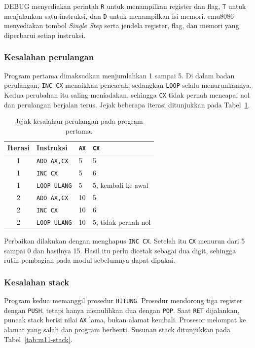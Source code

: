 DEBUG menyediakan perintah \texttt{R} untuk menampilkan register dan
flag, \texttt{T} untuk menjalankan satu instruksi, dan \texttt{D}
untuk menampilkan isi memori. emu8086 menyediakan tombol
\emph{Single Step} serta jendela register, flag, dan memori yang
diperbarui setiap instruksi.

\subsubsection*{Kesalahan perulangan}

Program pertama dimaksudkan menjumlahkan 1 sampai 5. Di dalam badan
perulangan, \texttt{INC CX} menaikkan pencacah, sedangkan
\texttt{LOOP} selalu menurunkannya. Kedua perubahan itu saling
meniadakan, sehingga \texttt{CX} tidak pernah mencapai nol dan
perulangan berjalan terus. Jejak beberapa iterasi ditunjukkan pada
Tabel~\ref{tab:m11-loop}.

\begin{table}[H]
    \centering
    \caption{Jejak kesalahan perulangan pada program pertama.}
    \label{tab:m11-loop}
    \small
    \begin{tabular}{@{}clll@{}}
        \toprule
        \textbf{Iterasi} & \textbf{Instruksi} & \texttt{AX} &
        \texttt{CX} \\
        \midrule
        1 & \texttt{ADD AX,CX} & 5 & 5 \\
        1 & \texttt{INC CX} & 5 & 6 \\
        1 & \texttt{LOOP ULANG} & 5 & 5, kembali ke awal \\
        2 & \texttt{ADD AX,CX} & 10 & 5 \\
        2 & \texttt{INC CX} & 10 & 6 \\
        2 & \texttt{LOOP ULANG} & 10 & 5, tidak pernah nol \\
        \bottomrule
    \end{tabular}
\end{table}

Perbaikan dilakukan dengan menghapus \texttt{INC CX}. Setelah itu
\texttt{CX} menurun dari 5 sampai 0 dan hasilnya 15. Hasil itu perlu
dicetak sebagai dua digit, sehingga rutin pembagian pada modul
sebelumnya dapat dipakai.

\subsubsection*{Kesalahan stack}

Program kedua memanggil prosedur \texttt{HITUNG}. Prosedur mendorong
tiga register dengan \texttt{PUSH}, tetapi hanya memulihkan dua
dengan \texttt{POP}. Saat \texttt{RET} dijalankan, puncak stack
berisi nilai \texttt{AX} lama, bukan alamat kembali. Prosesor
melompat ke alamat yang salah dan program berhenti. Susunan stack
ditunjukkan pada Tabel~\ref{tab:m11-stack}.

